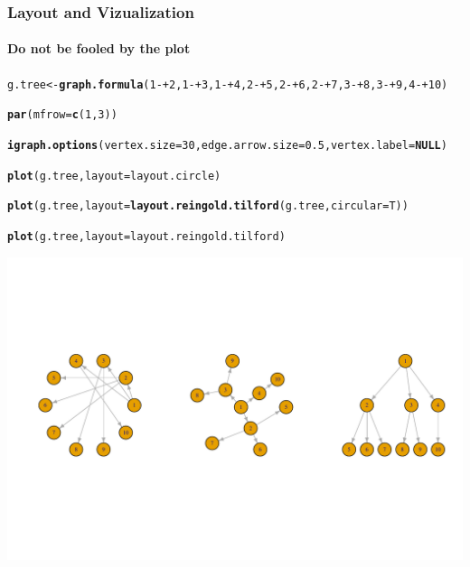\documentclass{beamer}\usepackage[]{graphicx}\usepackage[]{color}
\makeatletter
\newcommand{\hlnum}[1]{\textcolor[rgb]{0.686,0.059,0.569}{#1}}%
\newcommand{\hlopt}[1]{\textcolor[rgb]{0,0,0}{#1}}%
\newcommand{\hlstd}[1]{\textcolor[rgb]{0.345,0.345,0.345}{#1}}%
\newcommand{\hlkwa}[1]{\textcolor[rgb]{0.161,0.373,0.58}{\textbf{#1}}}%
\newcommand{\hlkwb}[1]{\textcolor[rgb]{0.69,0.353,0.396}{#1}}%
\newcommand{\hlkwc}[1]{\textcolor[rgb]{0.333,0.667,0.333}{#1}}%
\newcommand{\hlkwd}[1]{\textcolor[rgb]{0.737,0.353,0.396}{\textbf{#1}}}%
\newenvironment{kframe}{%
 \def\at@end@of@kframe{}%
 \ifinner\ifhmode%
  \def\at@end@of@kframe{\end{minipage}}%
  \begin{minipage}{\columnwidth}%
 \fi\fi%
 \def\FrameCommand##1{\hskip\@totalleftmargin \hskip-\fboxsep
 \colorbox{shadecolor}{##1}\hskip-\fboxsep
     \hskip-\linewidth \hskip-\@totalleftmargin \hskip\columnwidth}%
 \MakeFramed {\advance\hsize-\width
   \@totalleftmargin\z@ \linewidth\hsize
   \@setminipage}}%
 {\par\unskip\endMakeFramed%
 \at@end@of@kframe}
\newenvironment{knitrout}{}{} %
\makeatother
\begin{document}
\begin{frame}
  \frametitle{Layout and Vizualization}
  \framesubtitle{Do not be fooled by the plot}

\begin{knitrout}\scriptsize
{}\color{fgcolor}\begin{kframe}
\begin{alltt}
\hlstd{g.tree} \hlkwb{<-} \hlkwd{graph.formula}\hlstd{(}\hlnum{1}\hlopt{-+}\hlnum{2}\hlstd{,}\hlnum{1}\hlopt{-+}\hlnum{3}\hlstd{,}\hlnum{1}\hlopt{-+}\hlnum{4}\hlstd{,}\hlnum{2}\hlopt{-+}\hlnum{5}\hlstd{,}\hlnum{2}\hlopt{-+}\hlnum{6}\hlstd{,}\hlnum{2}\hlopt{-+}\hlnum{7}\hlstd{,} \hlnum{3}\hlopt{-+}\hlnum{8}\hlstd{,}\hlnum{3}\hlopt{-+}\hlnum{9}\hlstd{,}\hlnum{4}\hlopt{-+}\hlnum{10}\hlstd{)}

\hlkwd{par}\hlstd{(}\hlkwc{mfrow}\hlstd{=}\hlkwd{c}\hlstd{(}\hlnum{1}\hlstd{,} \hlnum{3}\hlstd{))}

\hlkwd{igraph.options}\hlstd{(}\hlkwc{vertex.size}\hlstd{=}\hlnum{30}\hlstd{,} \hlkwc{edge.arrow.size}\hlstd{=}\hlnum{0.5}\hlstd{,} \hlkwc{vertex.label}\hlstd{=}\hlkwa{NULL}\hlstd{)}

\hlkwd{plot}\hlstd{(g.tree,} \hlkwc{layout}\hlstd{=layout.circle)}

\hlkwd{plot}\hlstd{(g.tree,} \hlkwc{layout}\hlstd{=}\hlkwd{layout.reingold.tilford}\hlstd{(g.tree,}  \hlkwc{circular}\hlstd{=T))}

\hlkwd{plot}\hlstd{(g.tree,} \hlkwc{layout}\hlstd{=layout.reingold.tilford)}
\end{alltt}
\end{kframe}
\includegraphics[width=.8\textwidth]{figures/vizu_5-1} 

\end{knitrout}
  
\end{frame}
\end{document}
